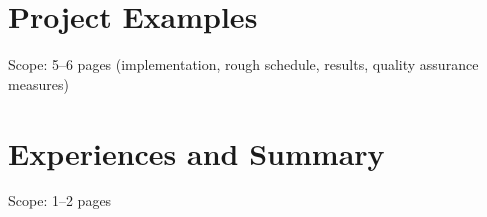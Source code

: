 \documentclass[type=internship,theme=fhooe24,language=english,titlelanguage=english,smartquotes]{hgbthesis}
\begin{document}
     
\chapter{Project Examples}

Scope: 5--6 pages (implementation, rough schedule, results, quality assurance measures)


\chapter{Experiences and Summary}

Scope: 1--2 pages


\end{document}
